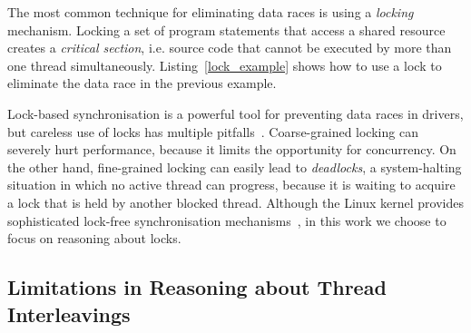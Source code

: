 %
%

The most common technique for eliminating data races is using a \emph{locking} mechanism. Locking a set of program statements that access a shared resource creates a \emph{critical section}, i.e. source code that cannot be executed by more than one thread simultaneously. Listing~\ref{lock_example} shows how to use a lock to eliminate the data race in the previous example.

Lock-based synchronisation is a powerful tool for preventing data races in drivers, but careless use of locks has multiple pitfalls~\cite{sutter2005software}. Coarse-grained locking can severely hurt performance, because it limits the opportunity for concurrency. On the other hand, fine-grained locking can easily lead to \emph{deadlocks}, a system-halting situation in which no active thread can progress, because it is waiting to acquire a lock that is held by another blocked thread. Although the Linux kernel provides sophisticated lock-free synchronisation mechanisms~\cite{corbet2005linux}, in this work we choose to focus on reasoning about locks.

\subsection{Limitations in Reasoning about Thread Interleavings}

